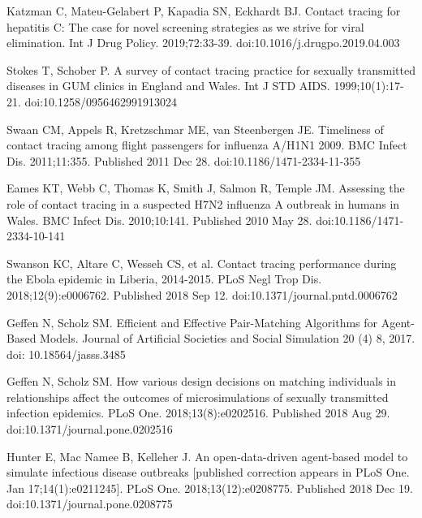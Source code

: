 \documentclass{article}
\begin{document}
\begin{thebibliography}{1}
  Katzman C, Mateu-Gelabert P, Kapadia SN, Eckhardt BJ.
  \newblock Contact tracing for hepatitis C: The case for novel screening
  strategies as we strive for viral elimination.
  \newblock Int J Drug Policy. 2019;72:33-39.
  \newblock doi:10.1016/j.drugpo.2019.04.003

  Stokes T, Schober P.
  \newblock A survey of contact tracing practice for sexually transmitted
  diseases in GUM clinics in England and Wales.
  \newblock Int J STD AIDS. 1999;10(1):17-21.
  \newblock doi:10.1258/0956462991913024

    Swaan CM, Appels R, Kretzschmar ME, van Steenbergen JE.
    \newblock Timeliness of contact tracing among flight passengers for
    influenza A/H1N1 2009.
    \newblock BMC Infect Dis. 2011;11:355. Published 2011 Dec 28.
    \newblock doi:10.1186/1471-2334-11-355

  Eames KT, Webb C, Thomas K, Smith J, Salmon R, Temple JM.
  \newblock Assessing the role of contact tracing in a suspected H7N2 influenza
  A outbreak in humans in Wales.
  \newblock BMC Infect Dis. 2010;10:141. Published 2010 May 28.
  \newblock doi:10.1186/1471-2334-10-141


  Swanson KC, Altare C, Wesseh CS, et al.
  \newblock Contact tracing performance during the Ebola epidemic in Liberia,
  2014-2015.
  \newblock PLoS Negl Trop Dis. 2018;12(9):e0006762. Published 2018 Sep 12.
  \newblock doi:10.1371/journal.pntd.0006762


  Geffen N, Scholz SM.
  \newblock Efficient and Effective Pair-Matching Algorithms for Agent-Based
  Models.
  \newblock Journal of Artificial Societies and Social Simulation 20 (4) 8,
  2017.
  \newblock doi: 10.18564/jasss.3485


  Geffen N, Scholz SM.
  \newblock How various design decisions on matching individuals in
  relationships affect the outcomes of microsimulations of sexually transmitted
  infection epidemics.
  \newblock PLoS One. 2018;13(8):e0202516. Published 2018 Aug 29.
  \newblock doi:10.1371/journal.pone.0202516

  Hunter E, Mac Namee B, Kelleher J.
  \newblock An open-data-driven agent-based model to simulate infectious disease
  outbreaks [published correction appears in PLoS One.
     Jan 17;14(1):e0211245]. PLoS
  One. 2018;13(12):e0208775. Published 2018 Dec 19.
  \newblock doi:10.1371/journal.pone.0208775


\end{thebibliography}
\end{document}
